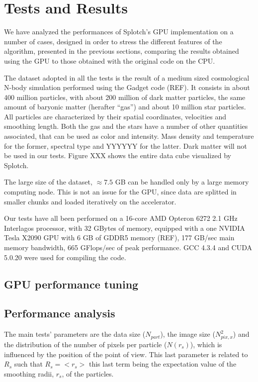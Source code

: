 \documentclass[11pt]{article}
\begin{document}
\section{Tests and Results}

We have analyzed the performances of Splotch's GPU implementation on a number of cases, designed in 
order to stress the different features of the algorithm, presented in the previous 
sections, comparing the results 
obtained using the GPU to those obtained with the original code on the CPU. 

The dataset adopted in all the tests is the result of a medium sized cosmological 
N-body simulation performed using the Gadget code (REF). It consists in about 
400 million particles, with about 200 million of dark matter particles, the same amount 
of baryonic matter (herafter ``gas'') and about 10 million star particles. 
All particles are characterized by their spatial coordinates, velocities
and smoothing length. 
Both the gas and the stars have a number of other quantities associated, that can be used 
as color and intensity. Mass density and temperature for the former, spectral type and YYYYYY
for the latter. Dark matter will not be used in our tests. Figure XXX shows 
the entire data cube visualized by Splotch.

The large size of the dataset, $\approx 7.5$ GB can be handled only by a large memory computing node. 
This is not an issue for the GPU, since data are splitted 
in smaller chunks and loaded iteratively on the accelerator. 

Our tests have all been performed on a 16-core AMD Opteron 6272 2.1 GHz Interlagos processor,
with 32 GBytes of memory, equipped with a one NVIDIA Tesla X2090 GPU with 6 GB of GDDR5 memory
(REF), 177 GB/sec 
main memory bandwidth, 665 GFlops/sec of peak performance. GCC 4.3.4 and CUDA 5.0.20 
were used for compiling the code.

\subsection{GPU performance tuning}


\subsection{Performance analysis}

The main tests' parameters are the data size ($N_{part}$),
the image size ($N_{pix,x}^2$) and the distribution of the number of pixels 
per particle ($N(r_s)$), which is influenced by the position of the point of view.
This last parameter is related to $R_s$ such that $R_s = <r_s>$ this last term 
being the expectation value of the smoothing radii, $r_s$, of the particles.
\end{document}
